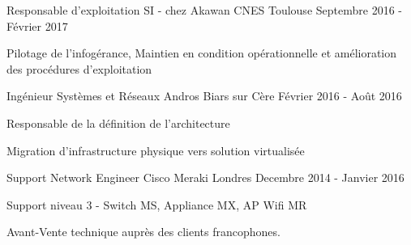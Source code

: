 \begin{cventries}
  \cventry
    {Responsable d'exploitation SI - chez Akawan} %
    {CNES} %
    {Toulouse} %
    {Septembre 2016 - Février 2017} %
    {
      \begin{cvitems} %
        \item {Pilotage de l'infogérance, Maintien en condition opérationnelle et amélioration des procédures d'exploitation}
      \end{cvitems}
    }
    
  \cventry
  {Ingénieur Systèmes et Réseaux} %
  {Andros} %
  {Biars sur Cère} %
  {Février 2016 - Août 2016} %
  {
    \begin{cvitems} %
      \item {Responsable de la définition de l'architecture}
      \item {Migration d'infrastructure physique vers solution virtualisée}
    \end{cvitems}
}

  \cventry
    {Support Network Engineer} %
    {Cisco Meraki} %
    {Londres} %
    {Decembre 2014 - Janvier 2016} %
    {
      \begin{cvdoubleitems} %
        \item {Support niveau 3 - Switch MS, Appliance MX, AP Wifi MR}
        \item {Avant-Vente technique auprès des clients francophones.}
      \end{cvdoubleitems}
    }

\end{cventries}
